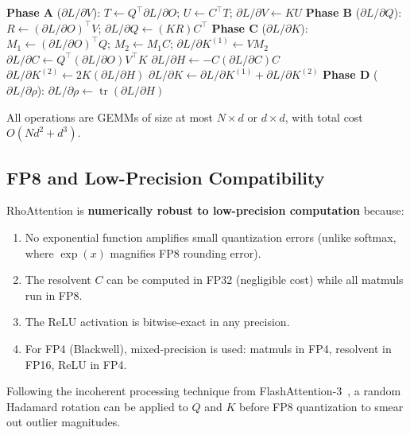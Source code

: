 \documentclass[11pt,a4paper]{article}
\theoremstyle{remark}
\DeclareMathOperator{\tr}{tr}
\begin{document}
\begin{algorithm}[h]
\caption{RhoAttention Backward Pass}
\begin{algorithmic}[1]
\State \textbf{Phase A} ($\partial L / \partial V$): $T \gets Q^\top \partial L/\partial O$; $U \gets C^\top T$; $\partial L/\partial V \gets K U$
\State \textbf{Phase B} ($\partial L / \partial Q$): $R \gets (\partial L/\partial O)^\top V$; $\partial L/\partial Q \gets (K R) C^\top$
\State \textbf{Phase C} ($\partial L / \partial K$):
\State \quad $M_1 \gets (\partial L/\partial O)^\top Q$; $M_2 \gets M_1 C$; $\partial L/\partial K^{(1)} \gets V M_2$
\State \quad $\partial L/\partial C \gets Q^\top (\partial L/\partial O) V^\top K$
\State \quad $\partial L/\partial H \gets -C (\partial L/\partial C) C$
\State \quad $\partial L/\partial K^{(2)} \gets 2 K (\partial L/\partial H)$
\State \quad $\partial L/\partial K \gets \partial L/\partial K^{(1)} + \partial L/\partial K^{(2)}$
\State \textbf{Phase D} ($\partial L / \partial \rho$): $\partial L/\partial \rho \gets \tr(\partial L/\partial H)$
\end{algorithmic}
\end{algorithm}

All operations are GEMMs of size at most $N \times d$ or $d \times d$, with total cost $O(Nd^2 + d^3)$.

\subsection{FP8 and Low-Precision Compatibility}

RhoAttention is \textbf{numerically robust to low-precision computation} because:
\begin{enumerate}[leftmargin=*]
    \item No exponential function amplifies small quantization errors (unlike softmax, where $\exp(x)$ magnifies FP8 rounding error).
    \item The resolvent $C$ can be computed in FP32 (negligible cost) while all matmuls run in FP8.
    \item The ReLU activation is bitwise-exact in any precision.
    \item For FP4 (Blackwell), mixed-precision is used: matmuls in FP4, resolvent in FP16, ReLU in FP4.
\end{enumerate}

Following the incoherent processing technique from FlashAttention-3~\cite{shah2024flashattention3}, a random Hadamard rotation can be applied to $Q$ and $K$ before FP8 quantization to smear out outlier magnitudes.
\end{document}
